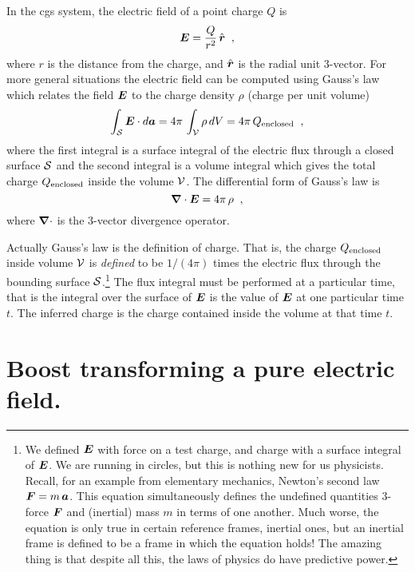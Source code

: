 In the cgs system, the electric field of a point charge $Q$ is
\begin{equation}
\mbox{\boldmath $E$}=\frac{Q}{r^2}\,\hat{\mbox{\boldmath $r$}} \;\;,
\end{equation}
where $r$ is the distance from the charge, and $\hat{\mbox{\boldmath $r$}}$ is the
radial unit 3-vector.  For more general situations the electric field
can be computed using Gauss's law which relates the field $\mbox{\boldmath $E$}$ to
the charge density $\rho$ (charge per unit volume)
\begin{equation}
\int_{\cal S} \mbox{\boldmath $E$}\cdot d\mbox{\boldmath $a$} = 4\pi\,\int_{\cal V} \rho\,dV
= 4\pi\,Q_{\rm enclosed} \;\;,
\end{equation}
where the first integral is a surface integral of the electric flux
through a closed surface $\cal S$ and the second integral is a volume
integral which gives the total charge $Q_{\rm enclosed}$ inside the
volume $\cal V$.  The differential form of Gauss's law is
\begin{equation}
\mbox{\boldmath $\nabla$}\cdot\mbox{\boldmath $E$} = 4\pi\,\rho \;\; ,
\end{equation}
where $\mbox{\boldmath $\nabla$}\cdot$ is the 3-vector divergence operator.

Actually Gauss's law is the definition of charge.  That is, the charge
$Q_{\rm enclosed}$ inside volume $\cal V$ is {\em defined\/} to be
$1/(4\pi)$ times the electric flux through the bounding surface $\cal
S$.\footnote{We defined $\mbox{\boldmath $E$}$ with force on a test charge, and
charge with a surface integral of $\mbox{\boldmath $E$}$.  We are running in
circles, but this is nothing new for us physicists.  Recall, for an
example from elementary mechanics, Newton's second law
$\mbox{\boldmath $F$}=m\,\mbox{\boldmath $a$}$.  This equation simultaneously defines the
undefined quantities 3-force $\mbox{\boldmath $F$}$ and (inertial) mass $m$ in terms
of one another.  Much worse, the equation is only true in certain
reference frames, inertial ones, but an inertial frame is defined to
be a frame in which the equation holds!  The amazing thing is that
despite all this, the laws of physics do have predictive power.}  The
flux integral must be performed at a particular time, that is the
integral over the surface of $\mbox{\boldmath $E$}$ is the value of $\mbox{\boldmath $E$}$ at one
particular time $t$.  The inferred charge is the charge contained
inside the volume at that time $t$.


\section{Boost transforming a pure electric field.}

